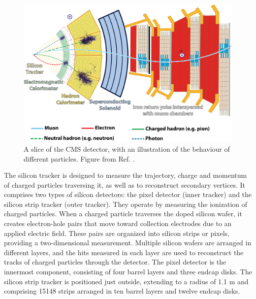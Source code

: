\begin{figure}[!ht]
    \vspace*{-0.0cm}
    \centering
    \setlength{\mylength}{\textwidth}
    \includegraphics[width=0.85\mylength]{resources/CMS_slice.png}
    \vspace*{-0.0cm}
    \caption{A slice of the CMS detector, with an illustration of the behaviour of different particles. Figure from Ref. \cite{Barney:2120661}.}
    \label{fig:CMS_slice}
    \vspace*{-0.3cm}
\end{figure}

The silicon tracker is designed to measure the trajectory, charge and momentum of charged particles traversing it, as well as to reconstruct secondary vertices. It comprises two types of silicon detectors: the pixel detector (inner tracker) and the silicon strip tracker (outer tracker). They operate by measuring the ionization of charged particles. When a charged particle traverses the doped silicon wafer, it creates electron-hole pairs that move toward collection electrodes due to an applied electric field. These pairs are organized into silicon strips or pixels, providing a two-dimensional measurement. Multiple silicon wafers are arranged in different layers, and the hits measured in each layer are used to reconstruct the tracks of charged particles through the detector. The pixel detector is the innermost component, consisting of four barrel layers and three endcap disks. The silicon strip tracker is positioned just outside, extending to a radius of 1.1 m and comprising 15148 strips arranged in ten barrel layers and twelve endcap disks.

